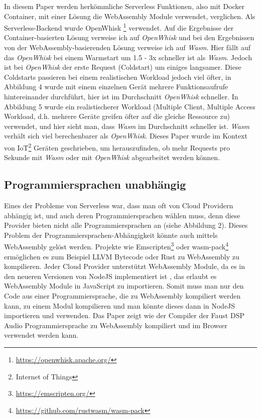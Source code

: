 In diesem Paper \cite{Hall2019} werden herkömmliche Serverless Funktionen, also mit Docker Container, mit einer Lösung die WebAssembly Module verwendet, verglichen. Als Serverless-Backend wurde OpenWhisk \footnote{\url{https://openwhisk.apache.org/}} verwendet. Auf die Ergebnisse der Container-basierten Lösung verweise ich auf \textit{OpenWhisk} und bei den Ergebnissen von der WebAssembly-basierenden Lösung verweise ich auf \textit{Wasm}. Hier fällt auf das \textit{OpenWhisk} bei einem Warmstart um 1.5 - 3x schneller ist als \textit{Wasm}. Jedoch ist bei \textit{OpenWhisk} der erste Request (Coldstart) um einiges langsamer. Diese Coldstarts passieren bei einem realistischen Workload jedoch viel öfter, in Abbildung 4 wurde mit einem einzelnen Gerät mehrere Funktionsaufrufe hintereinander durchführt, hier ist im Durchschnitt \textit{OpenWhisk} schneller. In Abbildung 5 wurde ein realistischerer Workload (Multiple Client, Multiple Access Workload, d.h. mehrere Geräte greifen öfter auf die gleiche Ressource zu) verwendet, und hier sieht man, dass \textit{Wasm} im Durchschnitt schneller ist. \textit{Wasm} verhält sich viel berechenbarer als \textit{OpenWhisk}. Dieses Paper wurde im Kontext von IoT\footnote{Internet of Things} Geräten geschrieben, um herauszufinden, ob mehr Requests pro Sekunde mit \textit{Wasm} oder mit \textit{OpenWhisk} abgearbeitet werden können.



\subsection{Programmiersprachen unabhängig}

Eines der Probleme von Serverless war, dass man oft von Cloud Providern abhängig ist, und auch deren Programmiersprachen wählen muss, denn diese Provider bieten nicht alle Programmiersprachen an (siehe Abbildung 2). Dieses Problem der Programmiersprachen-Abhängigkeit könnte auch mittels WebAssembly gelöst werden. Projekte wie Emscripten\footnote{\url{https://emscripten.org/}} oder wasm-pack\footnote{\url{https://github.com/rustwasm/wasm-pack}} ermöglichen es zum Beispiel LLVM Bytecode oder Rust zu WebAssembly zu kompilieren. Jeder Cloud Provider unterstützt WebAssembly Module, da es in den neueren Versionen von NodeJS implementiert ist \autocite[]{Wasm}, das erlaubt es WebAssembly Module in JavaScript zu importieren. Somit muss man nur den Code aus einer Programmiersprache, die zu WebAssembly kompiliert werden kann, zu einem Modul kompilieren und man könnte dieses dann in NodeJS importieren und verwenden. Das Paper \cite{Letz2018} zeigt wie der Compiler der Faust DSP Audio Programmiersprache zu WebAssembly kompiliert und im Browser verwendet werden kann.

